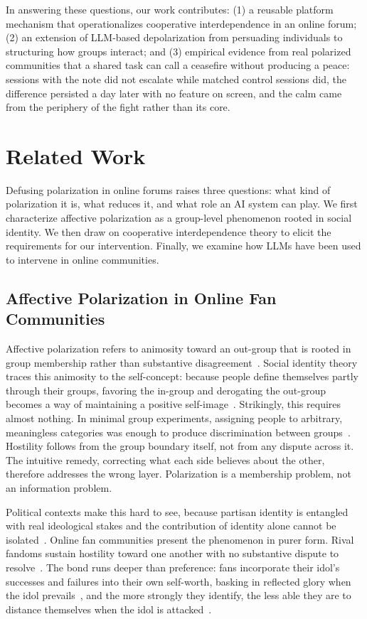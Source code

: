\documentclass[manuscript,screen,review,anonymous]{acmart}
\begin{document}
In answering these questions, our work contributes: (1) a reusable platform
mechanism that operationalizes cooperative interdependence in an online
forum; (2) an extension of LLM-based depolarization from persuading
individuals to structuring how groups interact; and (3) empirical evidence
from real polarized communities that a shared task can call a ceasefire
without producing a peace: sessions with the note did not escalate while
matched control sessions did, the difference persisted a day later with no
feature on screen, and the calm came from the periphery of the fight rather
than its core.

\section{Related Work}

Defusing polarization in online forums raises three questions: what kind of
polarization it is, what reduces it, and what role an AI system can play. We
first characterize affective polarization as a group-level phenomenon rooted
in social identity. We then draw on cooperative interdependence theory to
elicit the requirements for our intervention. Finally, we examine how LLMs
have been used to intervene in online communities.

\subsection{Affective Polarization in Online Fan Communities}

Affective polarization refers to animosity toward an out-group that is rooted
in group membership rather than substantive
disagreement~\cite{iyengar2012, iyengar2019}. Social identity theory traces
this animosity to the self-concept: because people define themselves partly
through their groups, favoring the in-group and derogating the out-group
becomes a way of maintaining a positive self-image~\cite{tajfel1979}.
Strikingly, this requires almost nothing. In minimal group experiments,
assigning people to arbitrary, meaningless categories was enough to produce
discrimination between groups~\cite{tajfel1971}. Hostility follows from the
group boundary itself, not from any dispute across it. The intuitive remedy,
correcting what each side believes about the other, therefore addresses the
wrong layer. Polarization is a membership problem, not an information
problem.

Political contexts make this hard to see, because partisan identity is
entangled with real ideological stakes and the contribution of identity alone
cannot be isolated~\cite{mason2018}. Online fan communities present the
phenomenon in purer form. Rival fandoms sustain hostility toward one another
with no substantive dispute to resolve~\cite{duffett2013}. The bond runs
deeper than preference: fans incorporate their idol's successes and failures
into their own self-worth, basking in reflected glory when the idol
prevails~\cite{cialdini1976}, and the more strongly they identify, the less
able they are to distance themselves when the idol is
attacked~\cite{wann1990}.
\end{document}

